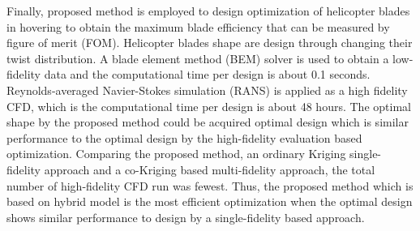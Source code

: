 \documentclass{report}
\begin{document}
Finally, proposed method is employed to design optimization of helicopter
blades in hovering to obtain the maximum blade efficiency that can be
measured by figure of merit (FOM). Helicopter blades shape are design
through changing their twist distribution. A blade element method (BEM)
solver is used to obtain a low-fidelity data and the computational time
per design is about 0.1 seconds. Reynolds-averaged Navier-Stokes
simulation (RANS) is applied as a high fidelity CFD, which is the
computational time per design is about 48 hours. The optimal shape by the
proposed method could be acquired optimal design which is similar
performance to the optimal design by the high-fidelity evaluation based
optimization. Comparing the proposed method, an ordinary Kriging
single-fidelity approach and a co-Kriging based multi-fidelity approach,
the total number of high-fidelity CFD run was fewest. Thus, the proposed
method which is based on hybrid model is the most efficient optimization
when the optimal design shows similar performance to design by a
single-fidelity based approach.
\end{document}
